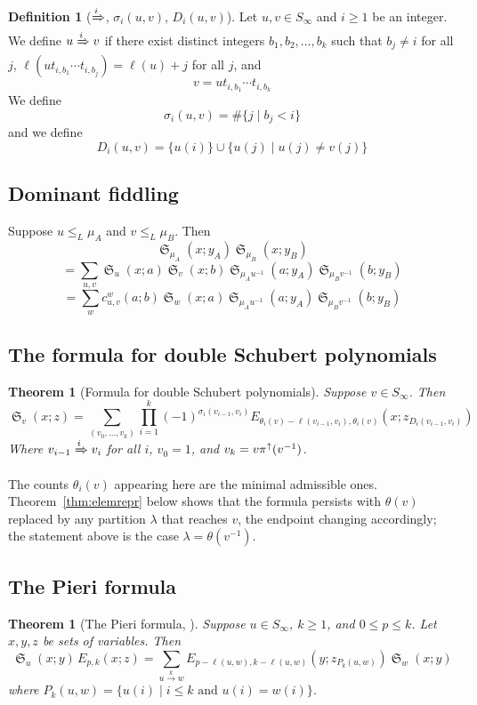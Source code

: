 \documentclass{amsart}
\newtheorem{theorem}[lemma]{Theorem}
\theoremstyle{definition}
\newtheorem{definition}[lemma]{Definition}
\theoremstyle{remark}
\numberwithin{equation}{section}
\DeclareMathOperator{\sch}{\mathfrak{S}}
\newcommand{\tom}[1]{\ensuremath{\xrightarrow{#1}}}
\begin{document}
\begin{definition}[$\xRightarrow{i}$, $\sigma_i(u,v)$, $D_i(u,v)$]
Let $u,v\in S_\infty$ and $i\geq 1$ be an integer. We define $u\xRightarrow{i} v$ if there exist distinct integers $b_1,b_2,\ldots,b_k$ such that $b_j\neq i$ for all $j$, $\ell(ut_{i,b_1}\cdots t_{i,b_j})=\ell(u)+j$ for all $j$, and 
$$v=ut_{i,b_1}\cdots t_{i,b_k}$$
We define
$$\sigma_i(u,v)=\#\{j\mid b_j<i\}$$
and we define
$$D_i(u,v)=\{u(i)\}\cup\{u(j)\mid u(j)\neq v(j)\}$$
\end{definition}

\subsection{Dominant fiddling}

Suppose $u\leq_L \mu_A$ and $v\leq_L \mu_B$. Then
$$\sch_{\mu_A}(x;y_A)\sch_{\mu_B}(x;y_B)$$
$$=\sum_{u,v}\sch_{u}(x;a)\sch_v(x;b)\sch_{\mu_Au^{-1}}(a;y_A)\sch_{\mu_Bv^{-1}}(b;y_B)$$
$$=\sum_w c_{u,v}^w(a;b)\sch_w(x;a)\sch_{\mu_Au^{-1}}(a;y_A)\sch_{\mu_Bv^{-1}}(b;y_B)$$

\subsection{The formula for double Schubert polynomials}

\begin{theorem}[Formula for double Schubert polynomials] \label{theorem:orddouble}
Suppose $v\in S_\infty$. Then
$$\sch_v(x;z)=\sum_{(v_0,\ldots,v_k)}\prod_{i=1}^k (-1)^{\sigma_i(v_{i-1},v_i)}E_{\theta_i(v)-\ell(v_{i-1},v_i),\theta_i(v)}(x;z_{D_i(v_{i-1},v_i)})$$
Where $v_{i-1}\xRightarrow{i} v_i$ for all $i$, $v_0=1$, and $v_k=v\pi^\uparrow(v^{-1})$.
\end{theorem}

The counts $\theta_i(v)$ appearing here are the minimal admissible ones. Theorem~\ref{thm:elemrepr} below shows that the formula persists with $\theta(v)$ replaced by any partition $\lambda$ that reaches $v$, the endpoint changing accordingly; the statement above is the case $\lambda=\theta(v^{-1})$.

\subsection{The Pieri formula}

\begin{theorem}[{The Pieri formula, \cite[Theorem~7.1]{samuelmolev}}] \label{theorem:pieri}
Suppose $u\in S_\infty$, $k\geq 1$, and $0\leq p\leq k$. Let $x,y,z$ be sets of variables. Then
$$\sch_u(x;y)\,E_{p,k}(x;z)=\sum_{u\tom{k} w}E_{p-\ell(u,w),k-\ell(u,w)}(y;z_{P_k(u,w)})\sch_w(x;y)$$
where $P_k(u,w)=\{u(i)\mid i\leq k\mbox{ and }u(i)=w(i)\}$.
\end{theorem}
\end{document}
